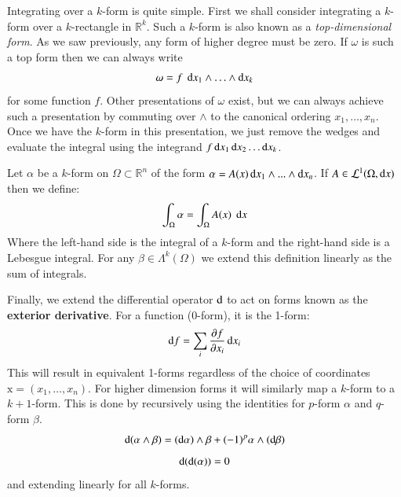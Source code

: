 Integrating over a $k$-form is quite simple.
First we shall consider integrating a $k$-form over a $k$-rectangle in $\mathbb{R}^k$.
Such a $k$-form is also known as a \emph{top-dimensional form}.
As we saw previously, any form of higher degree must be zero.
If $\omega$ is such a top form then we can always write
\begin{equation}
	\omega = f \; \mathop{}\!\mathrm{d} x_1 \wedge \ldots \wedge \mathop{}\!\mathrm{d} x_k
\end{equation}
for some function $f$.
Other presentations of $\omega$ exist, but we can always achieve such a presentation by commuting over $\wedge$ 
to the canonical ordering $x_1, \ldots, x_n$.
Once we have the $k$-form in this presentation, we just remove the wedges and evaluate the integral using the
integrand $f \mathop{}\!\mathrm{d} x_1 \mathop{}\!\mathrm{d} x_2 \ldots \mathop{}\!\mathrm{d} x_k$.

\begin{definition}
	Let $\alpha$ be a $k$-form on $\Omega \subset \mathbb{R}^n$ of the form 
	$\alpha = A(x) \mathop{}\!\mathrm{d} x_1 \wedge ... \wedge \mathop{}\!\mathrm{d} x_n$.
	If $A \in \mathcal{L}^1 (\Omega , \mathop{}\!\mathrm{d} x)$ then we define:
	\begin{equation}
		\int_\Omega \alpha = \int_\Omega A(x) \; \mathop{}\!\mathrm{d} x
	\end{equation}
	Where the left-hand side is the integral of a $k$-form and the right-hand side is a Lebesgue integral.
	For any $\beta \in \Lambda^k (\Omega)$ we extend this definition linearly as the sum of integrals.
\end{definition}

Finally, we extend the differential operator $\mathop{}\!\mathrm{d}$ to act on forms known as the \textbf{exterior derivative}.
For a function (0-form), it is the 1-form:
\begin{equation}
	\mathop{}\!\mathrm{d} f = \sum_i \frac{\partial f}{\partial x_i} \mathop{}\!\mathrm{d} x_i
\end{equation}
This will result in equivalent 1-forms regardless of the choice of coordinates $\text{x} = (x_1, \ldots, x_n)$.
For higher dimension forms it will similarly map a $k$-form to a $k+1$-form.
This is done by recursively using the identities for $p$-form $\alpha$ and $q$-form $\beta$.
\begin{equation}
	\mathop{}\!\mathrm{d} (\alpha \wedge \beta) = (\mathop{}\!\mathrm{d} \alpha) \wedge \beta + (-1)^p \alpha \wedge ( \mathop{}\!\mathrm{d} \beta)
\end{equation}
\begin{equation}
	\mathop{}\!\mathrm{d} (\mathop{}\!\mathrm{d} ( \alpha )) = 0
\end{equation}
and extending linearly for all $k$-forms.


